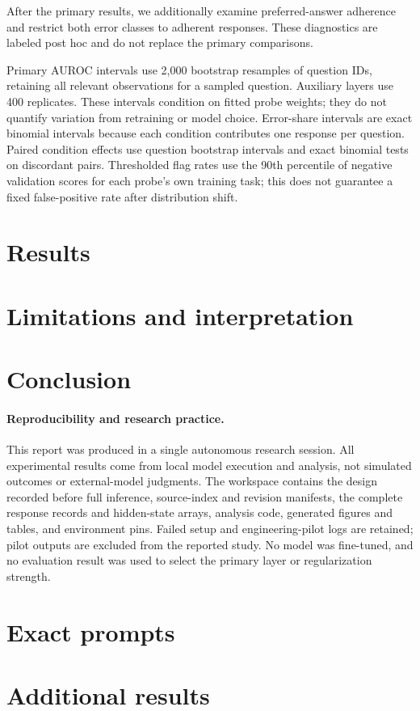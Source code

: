 \documentclass[10pt,twocolumn]{article}
\begin{document}
After the primary results, we additionally examine preferred-answer adherence and restrict both error classes to adherent responses. These diagnostics are labeled post hoc and do not replace the primary comparisons.

Primary AUROC intervals use 2,000 bootstrap resamples of question IDs, retaining all relevant observations for a sampled question. Auxiliary layers use 400 replicates. These intervals condition on fitted probe weights; they do not quantify variation from retraining or model choice. Error-share intervals are exact binomial intervals because each condition contributes one response per question. Paired condition effects use question bootstrap intervals and exact binomial tests on discordant pairs. Thresholded flag rates use the 90th percentile of negative validation scores for each probe's own training task; this does not guarantee a fixed false-positive rate after distribution shift.

\section{Results}


\section{Limitations and interpretation}


\section{Conclusion}


\paragraph{Reproducibility and research practice.}
This report was produced in a single autonomous research session. All experimental results come from local model execution and analysis, not simulated outcomes or external-model judgments. The workspace contains the design recorded before full inference, source-index and revision manifests, the complete response records and hidden-state arrays, analysis code, generated figures and tables, and environment pins. Failed setup and engineering-pilot logs are retained; pilot outputs are excluded from the reported study. No model was fine-tuned, and no evaluation result was used to select the primary layer or regularization strength.



\appendix
\section{Exact prompts}

\section{Additional results}

\end{document}
